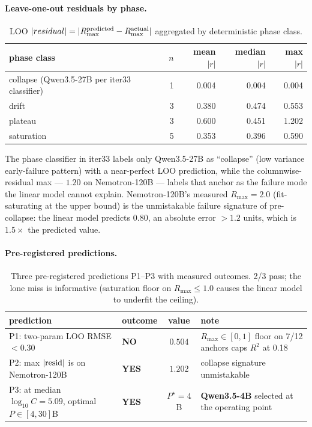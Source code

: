 \documentclass{article}
\begin{document}
\paragraph{Leave-one-out residuals by phase.}
\begin{table}[ht]
\centering\small
\begin{tabular}{lrrrr}
\toprule
phase class & $n$ & mean $|r|$ & median $|r|$ & max $|r|$ \\
\midrule
 collapse (Qwen3.5-27B per iter33 classifier) & 1 & 0.004 & 0.004 & 0.004 \\
 drift  & 3 & 0.380 & 0.474 & 0.553 \\
 plateau & 3 & 0.600 & 0.451 & 1.202 \\
 saturation & 5 & 0.353 & 0.396 & 0.590 \\
\bottomrule
\end{tabular}
\caption{LOO $|residual|=|R_{\max}^{\rm predicted}-R_{\max}^{\rm actual}|$ aggregated by deterministic phase class.}
\end{table}

The phase classifier in iter33 labels only Qwen3.5-27B as ``collapse'' (low variance early-failure pattern) with a near-perfect LOO prediction, while the columnwise-residual max --- $1.20$ on Nemotron-120B --- labels that anchor as the failure mode the linear model cannot explain. Nemotron-120B's measured $R_{\max}=2.0$ (fit-saturating at the upper bound) is the unmistakable failure signature of pre-collapse: the linear model predicts $0.80$, an absolute error $>1.2$ units, which is $1.5\times$ the predicted value.

\paragraph{Pre-registered predictions.}
\begin{table}[ht]
\centering\small
\begin{tabular}{llcl}
\toprule
prediction & outcome & value & note \\
\midrule
 P1: two-param LOO RMSE $< 0.30$ & \textbf{NO}  & $0.504$ & $R_{\max}\in[0,1]$ floor on 7/12 anchors caps $R^2$ at 0.18 \\
 P2: max $|{\rm resid}|$ is on Nemotron-120B & \textbf{YES} & $1.202$ & collapse signature unmistakable \\
 P3: at median $\log_{10}C=5.09$, optimal $P\in[4,30]$B & \textbf{YES} & $P^{\star}=4$B & \textbf{Qwen3.5-4B} selected at the operating point \\
\bottomrule
\end{tabular}
\caption{Three pre-registered predictions P1--P3 with measured outcomes. 2/3 pass; the lone miss is informative (saturation floor on $R_{\max}\le 1.0$ causes the linear model to underfit the ceiling).}
\end{table}
\end{document}
